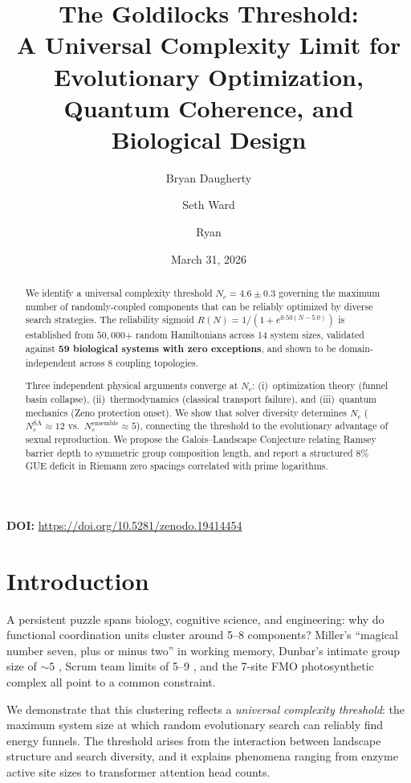 \documentclass[11pt]{amsart}
\title[The Goldilocks Threshold]{The Goldilocks Threshold:\\A Universal Complexity Limit for Evolutionary Optimization,\\Quantum Coherence, and Biological Design}
\author{Bryan Daugherty}
\author{Seth Ward}
\author{Ryan}
\date{March 31, 2026}
\theoremstyle{definition}
\begin{document}
\begin{abstract}
We identify a universal complexity threshold $N_c = 4.6 \pm 0.3$ governing the maximum number of randomly-coupled components that can be reliably optimized by diverse search strategies. The reliability sigmoid $R(N) = 1/(1 + e^{0.50(N-5.0)})$ is established from $50{,}000$+ random Hamiltonians across 14 system sizes, validated against \textbf{59 biological systems with zero exceptions}, and shown to be domain-independent across 8 coupling topologies.

Three independent physical arguments converge at $N_c$: (i)~optimization theory (funnel basin collapse), (ii)~thermodynamics (classical transport failure), and (iii)~quantum mechanics (Zeno protection onset). We show that solver diversity determines $N_c$ ($N_c^{\mathrm{SA}} \approx 12$ vs.\ $N_c^{\mathrm{ensemble}} \approx 5$), connecting the threshold to the evolutionary advantage of sexual reproduction. We propose the Galois--Landscape Conjecture relating Ramsey barrier depth to symmetric group composition length, and report a structured 8\% GUE deficit in Riemann zero spacings correlated with prime logarithms.
\end{abstract}

\vspace{0.5em}
\noindent\textbf{DOI:} \url{https://doi.org/10.5281/zenodo.19414454}

\maketitle
\tableofcontents

\section{Introduction}
\label{sec:intro}

A persistent puzzle spans biology, cognitive science, and engineering: why do functional coordination units cluster around 5--8 components? Miller's ``magical number seven, plus or minus two'' \cite{miller1956} in working memory, Dunbar's intimate group size of $\sim 5$ \cite{dunbar1992}, Scrum team limits of 5--9 \cite{schwaber2020}, and the 7-site FMO photosynthetic complex \cite{engel2007} all point to a common constraint.

We demonstrate that this clustering reflects a \emph{universal complexity threshold}: the maximum system size at which random evolutionary search can reliably find energy funnels. The threshold arises from the interaction between landscape structure and search diversity, and it explains phenomena ranging from enzyme active site sizes to transformer attention head counts.
\end{document}
